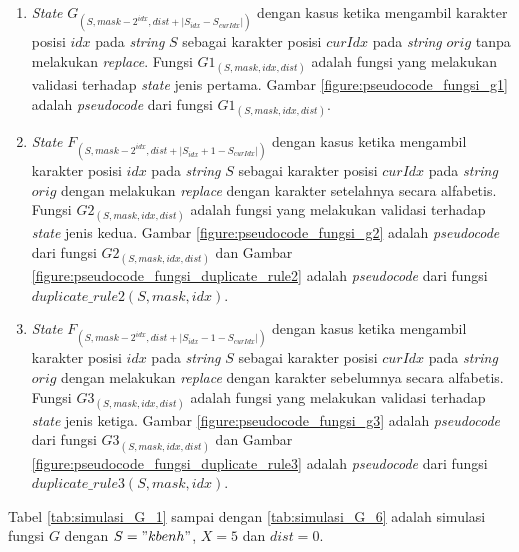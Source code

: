 \begin{enumerate}
	\item \textit{State} $ G_{(S, mask-2^{idx}, dist+|S_{idx}-S_{curIdx}|)} $ dengan kasus ketika mengambil karakter posisi $idx$ pada \textit{string} $S$ sebagai karakter posisi $curIdx$ pada \textit{string} $orig$ tanpa melakukan \textit{replace}. Fungsi $ G1_{(S, mask, idx, dist)} $ adalah fungsi yang melakukan validasi terhadap \textit{state} jenis pertama. Gambar \ref{figure:pseudocode_fungsi_g1} adalah \textit{pseudocode} dari fungsi $ G1_{(S, mask, idx, dist)} $.
	\item \textit{State} $ F_{(S, mask-2^{idx},  dist+|S_{idx}+1-S_{curIdx}|)} $ dengan kasus ketika mengambil karakter posisi $idx$ pada \textit{string} $S$ sebagai karakter posisi $curIdx$ pada \textit{string} $orig$ dengan melakukan \textit{replace} dengan karakter setelahnya secara alfabetis. Fungsi $ G2_{(S, mask, idx, dist)} $ adalah fungsi yang melakukan validasi terhadap \textit{state} jenis kedua. Gambar \ref{figure:pseudocode_fungsi_g2} adalah \textit{pseudocode} dari fungsi $ G2_{(S, mask, idx, dist)} $ dan Gambar \ref{figure:pseudocode_fungsi_duplicate_rule2} adalah \textit{pseudocode} dari fungsi $ duplicate\_rule2(S,mask,idx) $.
	\item \textit{State} $ F_{(S, mask-2^{idx}, dist+|S_{idx}-1-S_{curIdx}|)} $ dengan kasus ketika mengambil karakter posisi $idx$ pada \textit{string} $S$ sebagai karakter posisi $curIdx$ pada \textit{string} $orig$ dengan melakukan \textit{replace} dengan karakter sebelumnya secara alfabetis. Fungsi $ G3_{(S, mask, idx, dist)} $ adalah fungsi yang melakukan validasi terhadap \textit{state} jenis ketiga. Gambar \ref{figure:pseudocode_fungsi_g3} adalah \textit{pseudocode} dari fungsi $ G3_{(S, mask, idx, dist)} $ dan Gambar \ref{figure:pseudocode_fungsi_duplicate_rule3} adalah \textit{pseudocode} dari fungsi $ duplicate\_rule3(S,mask,idx) $.
\end{enumerate}

Tabel \ref{tab:simulasi_G_1} sampai dengan \ref{tab:simulasi_G_6} adalah simulasi fungsi $ G $ dengan $ S="kbenh" $, $ X=5 $ dan $ dist= 0$.

